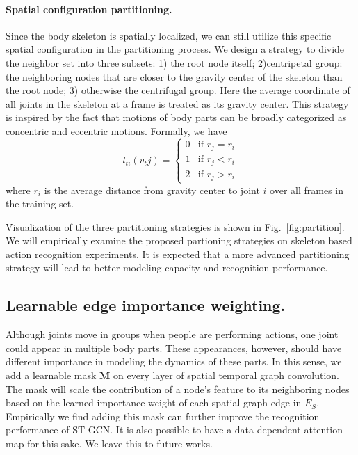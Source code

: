 \documentclass[letterpaper]{article} \usepackage{aaai18}  \usepackage{times}  \usepackage{helvet}  \usepackage{courier}  \usepackage{url}  \usepackage{graphicx}
\begin{document}
\paragraph{Spatial configuration partitioning.}
Since the body skeleton is spatially localized, we can still utilize this specific spatial configuration in the partitioning process.
We design a strategy to divide the neighbor set into three subsets:
1) the root node itself; 2)centripetal group: the neighboring nodes that are closer to the gravity center of the skeleton than the root node; 3) otherwise the centrifugal group.
Here the average coordinate of all joints in the skeleton at a frame is treated as its gravity center.
This strategy is inspired by the fact that motions of body parts can be broadly categorized as concentric and eccentric motions. Formally, we have 
\begin{equation}
l_{ti}({v_tj})=
	\begin{cases}
	   0 &\mbox{if $r_{j} = r_{i}$}\\
	   1 &\mbox{if $r_{j} < r_{i}$}\\
	   2 &\mbox{if $r_{j} > r_{i}$}
	\end{cases}
\end{equation}
where $r_i$ is the average distance from gravity center to joint $i$ over all frames in the training set.
 
Visualization of the three partitioning strategies is shown in Fig.~\ref{fig:partition}. We will empirically examine the proposed partioning strategies on skeleton based action recognition experiments. 
It is expected that a more advanced partitioning strategy will lead to better modeling capacity and recognition performance.



\subsection{Learnable edge importance weighting.}
Although joints move in groups when people are performing actions, one joint could appear in multiple body parts. These appearances, however, should have different importance in modeling the dynamics of these parts. 
In this sense, we add a learnable mask $ \mathbf{M} $ on every layer of spatial temporal graph convolution. 
The mask will scale the contribution of a node's feature to its neighboring nodes based on the learned importance weight of each spatial graph edge in $ E_S $.
Empirically we find adding this mask can further improve the recognition performance of ST-GCN.
It is also possible to have a data dependent attention map for this sake. We leave this to future works.
\end{document}
